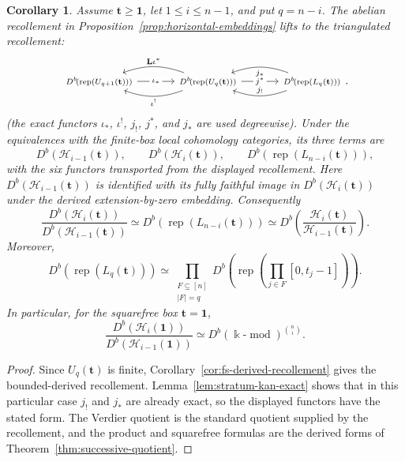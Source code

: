 \documentclass[12pt,reqno]{amsart}
\newtheorem{corollary}[theorem]{Corollary}
\theoremstyle{definition}
\theoremstyle{remark}
\newcommand{\Rep}{\operatorname{rep}}
\newcommand{\modcat}{\operatorname{mod}}
\begin{document}
\begin{corollary}\label{cor:derived-horizontal-recollement}
Assume $\mathbf t\ge\mathbf1$, let $1\le i\le n-1$, and put $q=n-i$.
The abelian recollement in Proposition~\ref{prop:horizontal-embeddings} lifts
to the triangulated recollement:
\[
\begin{tikzcd}[column sep=3.4em]
{\scriptstyle D^b\!\left(\Rep(U_{q+1}(\mathbf t))\right)}
  \arrow[r, "{\scriptstyle \iota_*}" description]
& {\scriptstyle D^b\!\left(\Rep(U_q(\mathbf t))\right)}
  \arrow[l, bend right=20, "{\scriptstyle \mathbf L\iota^*}"']
  \arrow[l, bend left=20, "{\scriptstyle \iota^!}"]
  \arrow[r, "{\scriptstyle j^*}" description]
& {\scriptstyle D^b\!\left(\Rep(L_q(\mathbf t))\right)}
  \arrow[l, bend left=20, "{\scriptstyle j_!}"']
  \arrow[l, bend right=20, "{\scriptstyle j_*}"]
\end{tikzcd}.
\]
(the exact functors $\iota_*$, $\iota^!$, $j_!$, $j^*$, and $j_*$ are used degreewise).  Under the equivalences with the finite-box local cohomology categories, its three terms are
\[
D^b\!\left(\mathcal H_{i-1}(\mathbf t)\right),
\qquad
D^b\!\left(\mathcal H_i(\mathbf t)\right),
\qquad
D^b\!\left(\Rep(L_{n-i}(\mathbf t))\right),
\]
with the six functors transported from the displayed recollement.
Here $D^b(\mathcal H_{i-1}(\mathbf t))$ is identified with its fully faithful
image in $D^b(\mathcal H_i(\mathbf t))$ under the derived extension-by-zero
embedding.  Consequently
\[
\frac{D^b(\mathcal H_i(\mathbf t))}
     {D^b(\mathcal H_{i-1}(\mathbf t))}
\simeq
D^b\!\left(\Rep(L_{n-i}(\mathbf t))\right)
\simeq
D^b\!\left(
\frac{\mathcal H_i(\mathbf t)}{\mathcal H_{i-1}(\mathbf t)}
\right).
\]
Moreover,
\[
D^b\!\left(\Rep(L_q(\mathbf t))\right)
\simeq
\prod_{\substack{F\subseteq[n]\\|F|=q}}
D^b\!\left(\Rep\!\left(\prod_{j\in F}[0,t_j-1]\right)\right).
\]
In particular, for the squarefree box $\mathbf t=\mathbf1$,
\[
\frac{D^b(\mathcal H_i(\mathbf1))}
     {D^b(\mathcal H_{i-1}(\mathbf1))}
\simeq
D^b(\Bbbk\text{-}\modcat)^{\binom{n}{i}}.
\]
\end{corollary}

\begin{proof}
Since $U_q(\mathbf t)$ is finite,
Corollary~\ref{cor:fs-derived-recollement} gives the bounded-derived
recollement.  Lemma~\ref{lem:stratum-kan-exact} shows that in this particular
case $j_!$ and $j_*$ are already exact, so the displayed functors have the
stated form.  The Verdier quotient is the standard quotient supplied by the
recollement, and the product and squarefree formulas are the derived forms of
Theorem~\ref{thm:successive-quotient}.
\end{proof}
\end{document}
